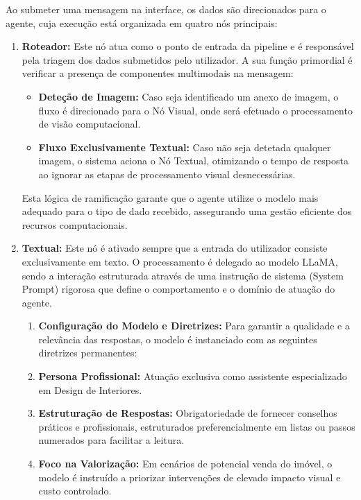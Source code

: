 \documentclass[a4paper,12pt]{scrreprt}
\begin{document}
        Ao submeter uma mensagem na interface, os dados são direcionados para o agente, cuja execução está organizada em quatro nós principais:
        \begin{enumerate}
            \item \textbf{Roteador:} Este nó atua como o ponto de entrada da pipeline e é responsável pela triagem dos dados submetidos pelo utilizador. A sua função primordial é verificar a presença de componentes multimodais na mensagem:
            \begin{itemize}
                \item \textbf{Deteção de Imagem:} Caso seja identificado um anexo de imagem, o fluxo é direcionado para o Nó Visual, onde será efetuado o processamento de visão computacional.
                \item \textbf{Fluxo Exclusivamente Textual:} Caso não seja detetada qualquer imagem, o sistema aciona o Nó Textual, otimizando o tempo de resposta ao ignorar as etapas de processamento visual desnecessárias.
            \end{itemize}
            Esta lógica de ramificação garante que o agente utilize o modelo mais adequado para o tipo de dado recebido, assegurando uma gestão eficiente dos recursos computacionais.
            \item \textbf{Textual:} Este nó é ativado sempre que a entrada do utilizador consiste exclusivamente em texto. O processamento é delegado ao modelo LLaMA, sendo a interação estruturada através de uma instrução de sistema (System Prompt) rigorosa que define o comportamento e o domínio de atuação do agente.
            \begin{enumerate}
                \item \textbf{Configuração do Modelo e Diretrizes:} Para garantir a qualidade e a relevância das respostas, o modelo é instanciado com as seguintes diretrizes permanentes:
                \item \textbf{Persona Profissional:} Atuação exclusiva como assistente especializado em Design de Interiores.
                \item \textbf{Estruturação de Respostas:} Obrigatoriedade de fornecer conselhos práticos e profissionais, estruturados preferencialmente em listas ou passos numerados para facilitar a leitura.
                \item \textbf{Foco na Valorização:} Em cenários de potencial venda do imóvel, o modelo é instruído a priorizar intervenções de elevado impacto visual e custo controlado.

\end{enumerate}
\end{enumerate}
\end{document}
